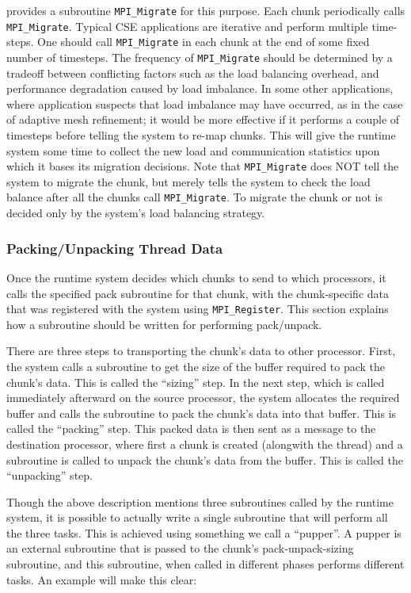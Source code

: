 \documentclass[10pt]{article}
\begin{document}
\ampi{} provides a subroutine \texttt{MPI\_Migrate} for this purpose. Each
chunk periodically calls \texttt{MPI\_Migrate}. Typical CSE applications are
iterative and perform multiple time-steps. One should call
\texttt{MPI\_Migrate} in each chunk at the end of some fixed number of
timesteps. The frequency of \texttt{MPI\_Migrate} should be determined by a
tradeoff between conflicting factors such as the load balancing overhead, and
performance degradation caused by load imbalance. In some other applications,
where application suspects that load imbalance may have occurred, as in the
case of adaptive mesh refinement; it would be more effective if it performs a
couple of timesteps before telling the system to re-map chunks. This will give
the \ampi{} runtime system some time to collect the new load and communication
statistics upon which it bases its migration decisions. Note that
\texttt{MPI\_Migrate} does NOT tell the system to migrate the chunk, but
merely tells the system to check the load balance after all the chunks call
\texttt{MPI\_Migrate}. To migrate the chunk or not is decided only by the
system's load balancing strategy.

\subsubsection{Packing/Unpacking Thread Data}

Once the \ampi{} runtime system decides which chunks to send to which
processors, it calls the specified pack subroutine for that chunk, with the
chunk-specific data that was registered with the system using
\texttt{MPI\_Register}. This section explains how a subroutine should be
written for performing pack/unpack.

There are three steps to transporting the chunk's data to other processor.
First, the system calls a subroutine to get the size of the buffer required to
pack the chunk's data. This is called the ``sizing'' step. In the next step,
which is called immediately afterward on the source processor, the system
allocates the required buffer and calls the subroutine to pack the chunk's data
into that buffer. This is called the ``packing'' step. This packed data is then
sent as a message to the destination processor, where first a chunk is created
(alongwith the thread) and a subroutine is called to unpack the chunk's data
from the buffer. This is called the ``unpacking'' step.

Though the above description mentions three subroutines called by the \ampi{}
runtime system, it is possible to actually write a single subroutine that will
perform all the three tasks. This is achieved using something we call a
``pupper''. A pupper is an external subroutine that is passed to the chunk's
pack-unpack-sizing subroutine, and this subroutine, when called in different
phases performs different tasks. An example will make this clear:
\end{document}
